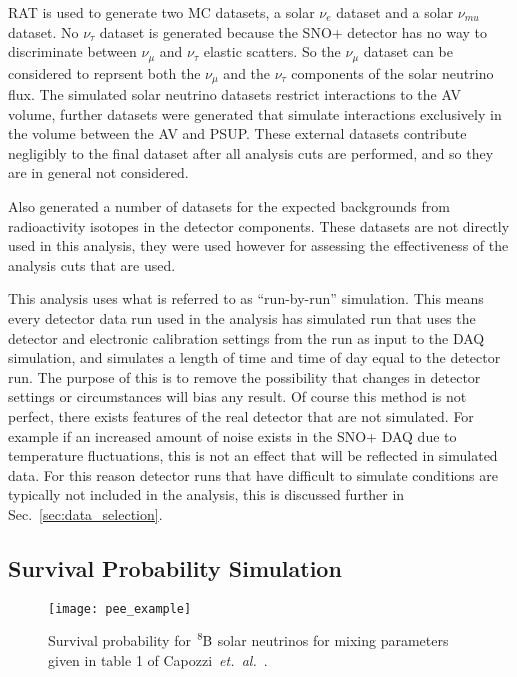 RAT is used to generate two MC datasets, a solar $\nu_{e}$ dataset
and a solar $\nu_{mu}$ dataset.
No $\nu_{\tau}$ dataset is generated because the SNO+ detector has
no way to discriminate between $\nu_{\mu}$ and $\nu_{\tau}$ elastic scatters.
So the $\nu_{\mu}$ dataset can be considered to reprsent both the $\nu_{\mu}$
and the $\nu_{\tau}$ components of the solar neutrino flux.
The simulated solar neutrino datasets restrict interactions to the AV volume,
further datasets were generated that simulate interactions exclusively in the
volume between the AV and PSUP\@.
These external datasets contribute negligibly to the final dataset after all
analysis cuts are performed, and so they are in general not considered.

Also generated a number of datasets for the expected backgrounds from
radioactivity isotopes in the detector components.
These datasets are not directly used in this analysis, they were used however
for assessing the effectiveness of the analysis cuts that are used.

This analysis uses what is referred to as ``run-by-run'' simulation.
This means every detector data run used in the analysis has simulated run that uses
the detector and electronic calibration settings from the run as input to the DAQ simulation, and simulates
a length of time and time of day equal to the detector run.
The purpose of this is to remove the possibility that changes in detector settings
or circumstances will bias any result.
Of course this method is not perfect, there exists features of the real detector
that are not simulated.
For example if an increased amount of noise exists in the SNO+ DAQ due to
temperature fluctuations, this is not an effect that will be reflected in
simulated data.
For this reason detector runs that have difficult to simulate conditions 
are typically not included in the analysis, this is discussed further
in Sec.~\ref{sec:data_selection}.

\subsection{Survival Probability Simulation}
\label{sec:survival_prob}
\begin{figure}[htbp]
\centering
\texttt{[image: pee\_example]}
\caption[$\ce{^{8}B}$ Solar Neutrino Survival Probability]{
Survival probability for $\ce{^{8}B}$ solar neutrinos for mixing parameters
given in table 1 of Capozzi~\textit{et.\ al.}~\citep{pdg_globalfit}.
}
\label{fig:example_survival_prob}
\end{figure}

